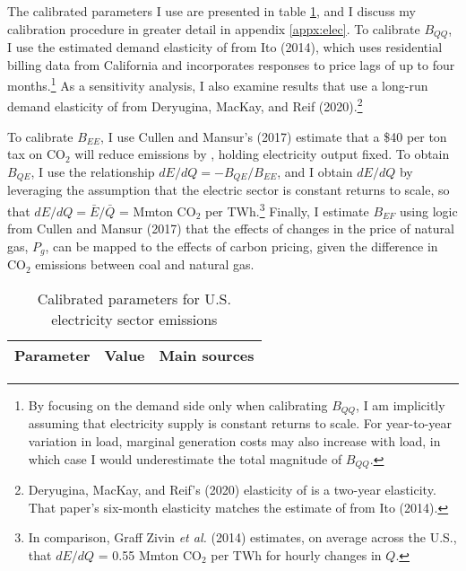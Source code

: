 \documentclass[12pt]{article}
\begin{document}
The calibrated parameters I use are presented in table \ref{tab:calelec}, and I discuss my calibration procedure in greater detail in appendix \ref{appx:elec}. To calibrate $B_{QQ}$, I use the estimated demand elasticity of from Ito (2014), which uses residential billing data from California and incorporates responses to price lags of up to four months.\footnote{By focusing on the demand side only when calibrating $B_{QQ}$, I am implicitly assuming that electricity supply is constant returns to scale. For year-to-year variation in load, marginal generation costs may also increase with load, in which case I would underestimate the total magnitude of $B_{QQ}$.} As a sensitivity analysis, I also examine results that use a long-run demand elasticity of from Deryugina, MacKay, and Reif (2020).\footnote{Deryugina, MacKay, and Reif's (2020) elasticity of is a two-year elasticity. That paper's six-month elasticity matches the estimate of from Ito (2014).} 

To calibrate $B_{EE}$, I use Cullen and Mansur's (2017) estimate that a \$40 per ton tax on CO$_2$ will reduce emissions by \unskip, holding electricity output fixed. To obtain $B_{QE}$, I use the relationship $dE/dQ = -B_{QE}/B_{EE}$, and I obtain $dE/dQ$ by leveraging the assumption that the electric sector is constant returns to scale, so that $dE/dQ = \bar{E}/\bar{Q}$ = Mmton CO$_2$ per TWh.\footnote{In comparison, Graff Zivin {\it et al.} (2014) estimates, on average across the U.S., that $dE/dQ$ = 0.55 Mmton CO$_2$ per TWh for hourly changes in $Q$.} Finally, I estimate $B_{EF}$ using logic from Cullen and Mansur (2017) that the effects of changes in the price of natural gas, $P_g$, can be mapped to the effects of carbon pricing, given the difference in CO$_2$ emissions between coal and natural gas.

\begin{table}[!t]
\begin{center}
\caption{Calibrated parameters for U.S. electricity sector emissions}
\begin{footnotesize}
\begin{tabular}{lll}
Parameter & Value & Main sources \\
\hline

\hline
\end{tabular}
\end{footnotesize}
\label{tab:calelec}
\end{center}
\end{table}
\end{document}
